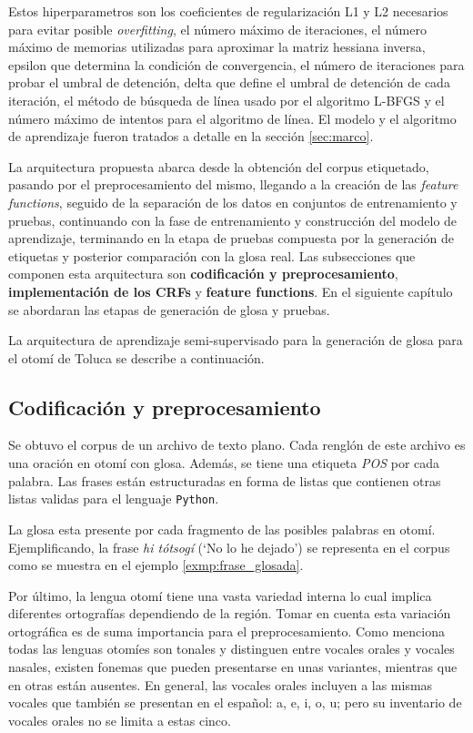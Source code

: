 \documentclass[letterpaper,12pt,oneside]{book}
\newcommand{\note}[4][]{\todo[author=#2,color=#3,size=\scriptsize,fancyline,caption={},#1]{#4}} %
\newcommand{\vic}[2][]{\note[#1]{Vic}{orange!40}{#2}}
\newcommand{\Vic}[2][]{\vic[inline,#1]{#2}\noindent}
\def\code#1{\texttt{#1}}
\theoremstyle{definition}
\begin{document}
Estos hiperparametros son  los coeficientes de regularización L1 y L2 necesarios para evitar posible \textit{overfitting}, el número máximo de iteraciones, el número máximo de memorias utilizadas para aproximar la matriz hessiana inversa, epsilon que determina la condición de convergencia, el número de iteraciones para probar el umbral de detención,  delta que define el umbral de detención de cada iteración, el método de búsqueda de línea usado por el algoritmo L-BFGS y el número máximo de intentos para el algoritmo de línea.
\Vic{Señalar los hiperparámetros que se utilizaromn en L-BFGS}
El modelo y el algoritmo de aprendizaje fueron tratados a detalle en la sección \ref{sec:marco}.

La arquitectura propuesta abarca desde la obtención del corpus etiquetado, pasando por el preprocesamiento del mismo, llegando a la creación de las \textit{feature functions}, seguido de la separación de los datos en conjuntos de entrenamiento y pruebas, continuando con la fase de entrenamiento y construcción del modelo de aprendizaje, terminando en la etapa de pruebas compuesta por la generación de etiquetas y posterior comparación con la glosa real. Las subsecciones que componen esta arquitectura son \textbf{codificación y preprocesamiento}, \textbf{implementación de los CRFs} y \textbf{feature functions}. En el siguiente capítulo se abordaran las etapas de generación de glosa y pruebas.

La arquitectura de aprendizaje semi-supervisado para la generación de glosa para el otomí de Toluca se describe a continuación.

\subsection{Codificación y preprocesamiento}

Se obtuvo el corpus de un archivo de texto plano. Cada renglón de este archivo es una oración en otomí con glosa. Además, se tiene una etiqueta \textit{POS} por cada palabra. Las frases están estructuradas en forma de listas que contienen otras listas validas para el lenguaje \code{Python}.

La glosa esta presente por cada fragmento de las posibles palabras en otomí. Ejemplificando, la frase \textit{hi tótsogí} (`No lo he dejado') se representa en el corpus como se muestra en el ejemplo \ref{exmp:frase_glosada}.

Por último, la lengua otomí tiene una vasta variedad interna lo cual implica diferentes ortografías dependiendo de la región. Tomar en cuenta esta variación ortográfica es de suma importancia para el preprocesamiento. Como menciona \cite{elotl2019otomiprepro} todas las lenguas otomíes son tonales y distinguen entre vocales orales y vocales nasales, existen fonemas que pueden presentarse en unas variantes, mientras que en otras están ausentes. En general, las vocales orales incluyen a las mismas vocales que también se presentan en el español: a, e, i, o, u; pero su inventario de vocales orales no se limita a estas cinco.
\end{document}
